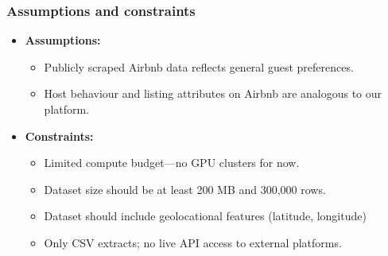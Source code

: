 \subsubsection{Assumptions and constraints}
\label{sec:AssumptionsConstraints}
\begin{itemize}
  \item \textbf{Assumptions:}  
    \begin{itemize}
      \item Publicly scraped Airbnb data reflects general guest preferences.  
      \item Host behaviour and listing attributes on Airbnb are analogous to our platform.  
    \end{itemize}
  \item \textbf{Constraints:}  
    \begin{itemize}
      \item Limited compute budget—no GPU clusters for now.  
      \item Dataset size should be at least 200 MB and 300,000 rows.  
      \item Dataset should include geolocational features (latitude, longitude)
      \item Only CSV extracts; no live API access to external platforms.  
    \end{itemize}
\end{itemize}

